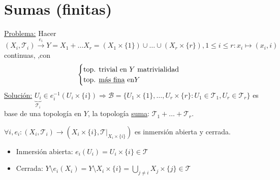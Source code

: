 \section{Sumas (finitas)}%
\label{sec:sumas_finitas_}
\underline{Problema:} Hacer $\left( X_i, \mathcal{T}_i \right) \xrightarrow{e_i} Y = X_1 + \ldots X_r = \left( X_1 \times \{1\} \right) \cup \ldots \cup \left( X_r \times \{r\} \right), 1 \le i \le r: x_i \mapsto \left( x_i, i \right)$ continuas, ,con 
\[
\begin{cases}
    \text{top. trivial en } Y \text{ matrivialidad}\\
    \text{top. \underline{más fina} en} Y
\end{cases} 
\]
\underline{Solución:} $\underbrace{U_i}_{\mathcal{T}_i} \in e_i^{-1}\left( U_i \times \{i\} \right) \Rightarrow \mathcal{B} = \{U_1 \times \{1\}, \ldots, U_r \times \{r\}: U_1 \in \mathcal{T}_1, U_r \in \mathcal{T}_r\}$ es base de una topología en $Y$, la topología \underline{suma}: $\mathcal{T}_1 + \ldots + \mathcal{T}_r$.

\begin{prop}
$\forall i, e_i: \left( X_i, \mathcal{T}_i \right) \rightarrow \left( X_i\times \{i\}, \mathcal{T}|_{X_i \times \{i\}} \right)$ es inmersión abierta y cerrada.
\end{prop}
\begin{demo}
\begin{itemize}
    \item Inmersión abierta: $e_i\left( U_i \right) = U_i \times \{i\} \in \mathcal{T}$
    \item Cerrada: $Y\setminus e_i\left( X_i \right) = Y \setminus X_i \times \{i\} = \bigcup_{j \neq i} X_j \times \{j\} \in \mathcal{T}$
\end{itemize}
\end{demo}

